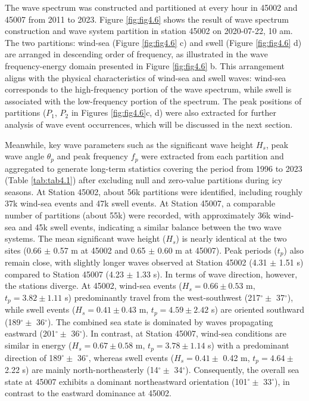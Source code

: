 The wave spectrum was constructed and partitioned at every hour in 45002 and
45007 from 2011 to 2023. Figure \ref{fig:fig4.6} shows the result of wave
spectrum construction and wave system partition in station 45002 on 2020-07-22,
10 am. The two partitions: wind-sea (Figure \ref{fig:fig4.6} c) and swell
(Figure \ref{fig:fig4.6} d) are arranged in descending order of frequency, as
illustrated in the wave frequency-energy domain presented in Figure
\ref{fig:fig4.6} b. This arrangement aligns with the physical characteristics of
wind-sea and swell waves: wind-sea corresponds to the high-frequency portion of
the wave spectrum, while swell is associated with the low-frequency portion of
the spectrum. The peak positions of partitions (\eg $P_1$, $P_2$ in Figures
\ref{fig:fig4.6}c, d) were also extracted for further analysis of wave event
occurrences, which will be discussed in the next section. 

Meanwhile, key wave parameters such as the significant wave height $H_s$, peak
wave angle $\theta_p$ and peak frequency $f_p$ were extracted from each
partition and aggregated to generate long-term statistics covering the period
from 1996 to 2023 (Table \ref{tab:tab4.1}) after excluding null and zero-value
partitions during icy seasons. At Station 45002, about 56k partitions were
identified, including roughly 37k wind-sea events and 47k swell events.  At
Station 45007, a comparable number of partitions (about 55k) were recorded, with
approximately 36k wind-sea and 45k swell events, indicating a similar balance
between the two wave systems. The mean significant wave height ($H_s$) is nearly
identical at the two sites (0.66 $\pm$ 0.57 m at 45002 and 0.65 $\pm$ 0.60 m at
45007). Peak periods ($t_p$) also remain close, with slightly longer waves
observed at Station 45002 (4.31 $\pm$ 1.51 s) compared to Station 45007 (4.23
$\pm$ 1.33 s). In terms of wave direction, however, the stations diverge. At
45002, wind-sea events ($H_s = 0.66 \pm 0.53$ m, $t_p = 3.82 \pm 1.11$ s)
predominantly travel from the west-southwest (217$^\circ \pm$ 37$^\circ$), while
swell events ($H_s = 0.41 \pm 0.43$ m, $t_p = 4.59 \pm 2.42$ s) are oriented
southward (189$^\circ \pm$ 36$^\circ$). The combined sea state is dominated by
waves propagating eastward (201$^\circ \pm$ 36$^\circ$). In contrast, at Station
45007, wind-sea conditions are similar in energy ($H_s = 0.67 \pm 0.58$ m, $t_p
= 3.78 \pm 1.14$ s) with a predominant direction of 189$^\circ \pm$ 36$^\circ$, 
whereas swell events ($H_s = 0.41 \pm$ 0.42 m, $t_p = 4.64 \pm$ 2.22 s) are
mainly north-northeasterly (14$^\circ \pm$ 34$^\circ$). Consequently, the
overall sea state at 45007 exhibits a dominant northeastward orientation 
(101$^\circ \pm$ 33$^\circ$), in contrast to the eastward dominance at 45002.

